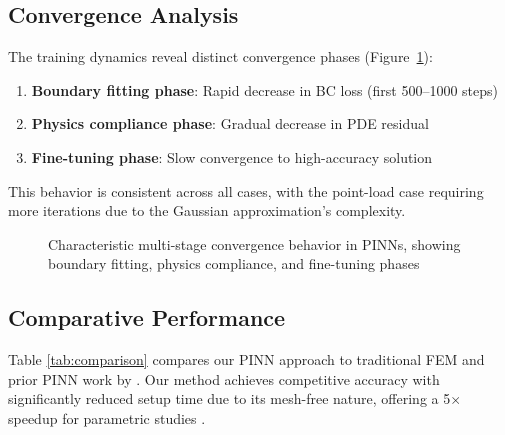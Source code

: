 \documentclass[12pt]{article}
\begin{document}
\subsection{Convergence Analysis}
The training dynamics reveal distinct convergence phases (Figure~\ref{fig:convergence_stages}):
\begin{enumerate}
	\item \textbf{Boundary fitting phase}: Rapid decrease in BC loss (first 500--1000 steps)
	\item \textbf{Physics compliance phase}: Gradual decrease in PDE residual
	\item \textbf{Fine-tuning phase}: Slow convergence to high-accuracy solution
\end{enumerate}
This behavior is consistent across all cases, with the point-load case requiring more iterations due to the Gaussian approximation's complexity.

\begin{figure}[htbp]
	\centering
	\caption{Characteristic multi-stage convergence behavior in PINNs, showing boundary fitting, physics compliance, and fine-tuning phases}
	\label{fig:convergence_stages}
\end{figure}

\subsection{Comparative Performance}
Table \ref{tab:comparison} compares our PINN approach to traditional FEM and prior PINN work by \citet{Zhang2020}. Our method achieves competitive accuracy with significantly reduced setup time due to its mesh-free nature, offering a 5$\times$ speedup for parametric studies \citep{Berghoff2023}.
\end{document}
